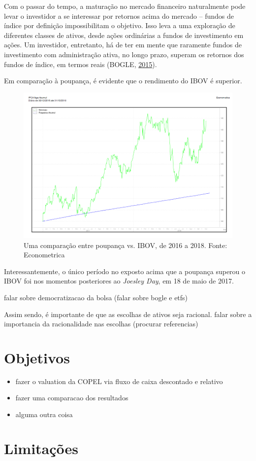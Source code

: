 \documentclass[grad,numbers]{coppe}
\providecommand{\tightlist}{%
  \setlength{\itemsep}{0pt}\setlength{\parskip}{0pt}}
\begin{document}
  Com o passar do tempo, a maturação no mercado financeiro naturalmente pode levar o investidor a se interessar por retornos acima do mercado -- fundos de índice por definição impossibilitam o objetivo. Isso leva a uma exploração de diferentes classes de ativos, desde ações ordinárias a fundos de investimento em ações. Um investidor, entretanto, há de ter em mente que raramente fundos de investimento com administração ativa, no longo prazo, superam os retornos dos fundos de índice, em termos reais (BOGLE, \protect\hyperlink{ref-bogle2015}{2015}).
  
  Em comparação à poupança, é evidente que o rendimento do IBOV é superior.
  \begin{figure}[H]
  \includegraphics[width=1\linewidth]{figure/poupanca-ou-acoes-grafico} \caption{Uma comparação entre poupança vs. IBOV, de 2016 a 2018. Fonte: Econometrica}\label{fig:ibovpoupanca}
  \end{figure}
  Interessantemente, o único período no exposto acima que a poupança superou o IBOV foi nos momentos posteriores ao \emph{Joesley Day}, em 18 de maio de 2017.
  
  falar sobre democratizacao da bolsa (falar sobre bogle e etfs)
  
  Assim sendo, é importante de que as escolhas de ativos seja racional.
  falar sobre a importancia da racionalidade nas escolhas (procurar referencias)
  
  \hypertarget{objetivos}{%
  \section{Objetivos}\label{objetivos}}
  \begin{itemize}
  \tightlist
  \item
    fazer o valuation da COPEL via fluxo de caixa descontado e relativo
  \item
    fazer uma comparacao dos resultados
  \item
    alguma outra coisa
  \end{itemize}
  \hypertarget{limitauxe7uxf5es}{%
  \section{Limitações}\label{limitauxe7uxf5es}}
  
\end{document}
